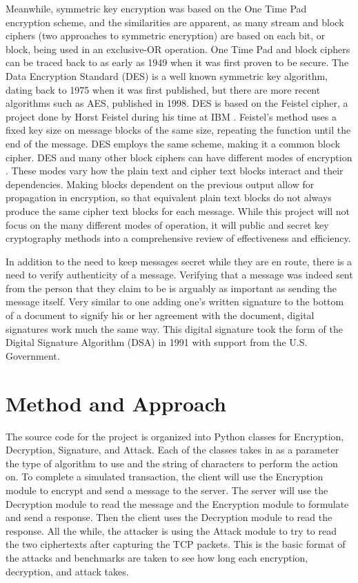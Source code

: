 \documentclass[12pt]{report}
\begin{document}
Meanwhile, symmetric key encryption was based on the One Time Pad encryption scheme, and the similarities are apparent, as many stream and block ciphers (two
approaches to symmetric encryption) are based on each bit, or block, being used in an exclusive-OR operation. One Time Pad and block ciphers can be traced back
to as early as 1949 when it was first proven to be secure. The Data Encryption Standard (DES) is a well known symmetric key algorithm, dating back to 1975 when
it was first published, but there are more recent algorithms such as AES, published in 1998. DES is based on the Feistel cipher, a project done by Horst Feistel
during his time at IBM \cite{feistel}. Feistel's method uses a fixed key size on message blocks of the same size, repeating the function until the end of the
message. DES employs the same scheme, making it a common block cipher. DES and many other block ciphers can have different modes of encryption \cite{modes}. These
modes vary how the plain text and cipher text blocks interact and their dependencies. Making blocks dependent on the previous output allow for propagation in
encryption, so that equivalent plain text blocks do not always produce the same cipher text blocks for each message. While this project will not focus on the many
different modes of operation, it will public and secret key cryptography methods into a comprehensive review of effectiveness and efficiency.

In addition to the need to keep messages secret while they are en route, there is a need to verify authenticity of a message. Verifying that a message was indeed
sent from the person that they claim to be is arguably as important as sending the message itself. Very similar to one adding one's written signature to the bottom
of a document to signify his or her agreement with the document, digital signatures work much the same way. This digital signature took the form of the Digital
Signature Algorithm (DSA) in 1991 with support from the U.S. Government.\cite{mit}\cite{dsa}

\section{Method and Approach}
The source code for the project is organized into Python classes for Encryption, Decryption, Signature, and Attack. Each of the classes takes in as a parameter the
type of algorithm to use and the string of characters to perform the action on. To complete a simulated transaction, the client will use the Encryption module to
encrypt and send a message to the server. The server will use the Decryption module to read the message and the Encryption module to formulate and send a response.
Then the client uses the Decryption module to read the response. All the while, the attacker is using the Attack module to try to read the two ciphertexts after
capturing the TCP packets. This is the basic format of the attacks and benchmarks are taken to see how long each encryption, decryption, and attack takes.
\end{document}
